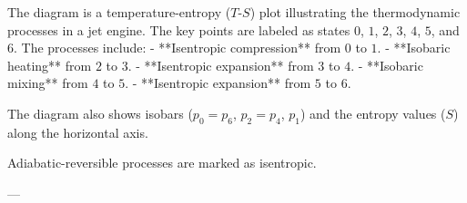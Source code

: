 The diagram is a temperature-entropy (\( T \)-\( S \)) plot illustrating the thermodynamic processes in a jet engine. The key points are labeled as states \( 0 \), \( 1 \), \( 2 \), \( 3 \), \( 4 \), \( 5 \), and \( 6 \). The processes include:  
- **Isentropic compression** from \( 0 \) to \( 1 \).  
- **Isobaric heating** from \( 2 \) to \( 3 \).  
- **Isentropic expansion** from \( 3 \) to \( 4 \).  
- **Isobaric mixing** from \( 4 \) to \( 5 \).  
- **Isentropic expansion** from \( 5 \) to \( 6 \).  

The diagram also shows isobars (\( p_0 = p_6 \), \( p_2 = p_4 \), \( p_1 \)) and the entropy values (\( S \)) along the horizontal axis.  

Adiabatic-reversible processes are marked as isentropic.  

---